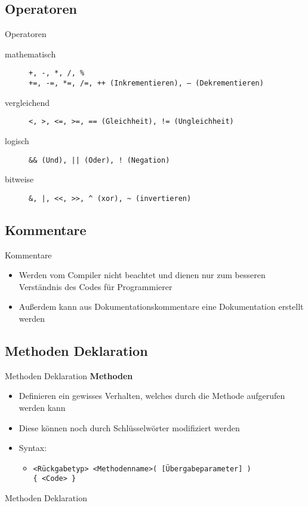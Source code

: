 \subsection{Operatoren}
\begin{frame}{Operatoren}
	\begin{description}
	    \item[mathematisch] \texttt{\alert{+}, \alert{-}, \alert{*}, \alert{/},	\alert{\%}}\\
	    \texttt{\alert{+=}, \alert{-=}, \alert{*=}, \alert{/=}, \alert{++} (Inkrementieren), \alert{--} (Dekrementieren)}
	    \item[vergleichend] \texttt{\alert{<}, \alert{>}, \alert{<=}, \alert{>=}, \alert{==} (Gleichheit), \alert{!=} (Ungleichheit)}
	    \item[logisch] \texttt{\alert{\&\&} (Und), \alert{||} (Oder), \alert{!} (Negation)}
	    \item[bitweise] \texttt{\alert{\&}, \alert{|}, \alert{<<}, \alert{>>}, \alert{\texttt{\^}} (xor), \alert{\texttt{\~}} (invertieren)}
	\end{description}
\end{frame}

\subsection{Kommentare}
\begin{frame}{Kommentare}
	\begin{itemize}
		\item Werden vom Compiler nicht beachtet und dienen nur zum besseren Verständnis des Codes für Programmierer
		\item Außerdem kann aus Dokumentationskommentare eine Dokumentation erstellt werden
	\end{itemize}
	
\end{frame}

\subsection{Methoden Deklaration}
\begin{frame}{Methoden Deklaration}
	\textbf{Methoden}\\
	\begin{itemize}
		\item Definieren ein gewisses Verhalten, welches durch die Methode aufgerufen werden kann
		\item Diese können noch durch Schlüsselwörter modifiziert werden
		\item Syntax:
		\begin{itemize}			
			\item \texttt{\alert{<Rückgabetyp> <Methodenname>}( \alert{[Übergabeparameter]} ) \\ \{ \alert{<Code>} \}}
		\end{itemize}
	\end{itemize}		
\end{frame}

\begin{frame}{Methoden Deklaration}
	
		
\end{frame}


